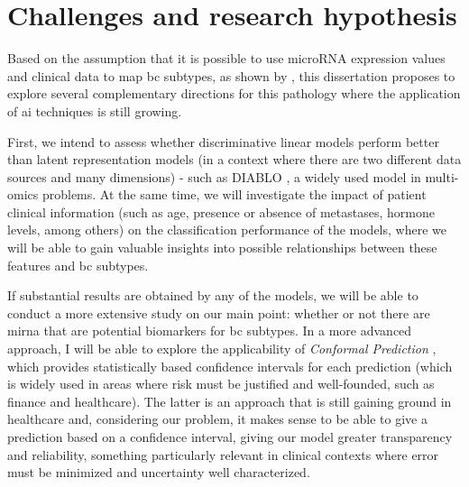 \section{Challenges and research hypothesis}
\label{sec:challenges+research-hypothesis}
Based on the assumption that it is possible to use microRNA expression values
and clinical data to map \gls{bc} subtypes, as shown by
\textcites{mirna_as_biomarkers_Ho2022}{mirnas_in_bc_Muñoz2023}, this dissertation
proposes to explore several complementary directions for this pathology where
the application of \gls{ai} techniques is still growing.

First, we intend to assess whether discriminative linear models perform better
than latent representation models (in a context where there are two different
data sources and many dimensions) - such as DIABLO \cite{DIABLO_Singh2019}, a
widely used model in multi-omics problems. At the same time, we will
investigate the impact of patient clinical information (such as age, presence
or absence of metastases, hormone levels, among others) on the classification
performance of the models, where we will be able to gain valuable insights into
possible relationships between these features and \gls{bc} subtypes.

If substantial results are obtained by any of the models, we will be able to
conduct a more extensive study on our main point: whether or not there are
\gls{mirna} that are potential biomarkers for \gls{bc} subtypes. In a more
advanced approach, I will be able to explore the applicability of
\textit{Conformal Prediction} \cite{conformal_prediction_Angelopoulos2023},
which provides statistically based confidence intervals for each prediction
(which is widely used in areas where risk must be justified and well-founded,
such as finance and healthcare). The latter is an approach that is still
gaining ground in healthcare and, considering our problem, it makes sense to be
able to give a prediction based on a confidence interval, giving our model
greater transparency and reliability, something particularly relevant in
clinical contexts where error must be minimized and uncertainty well
characterized.

